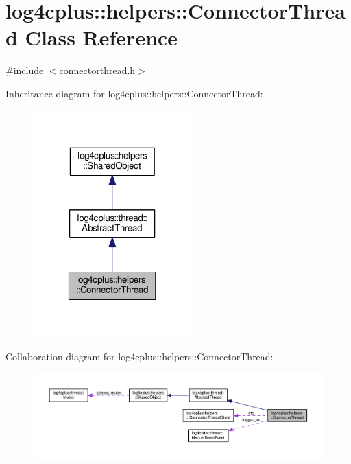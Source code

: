\hypertarget{classlog4cplus_1_1helpers_1_1ConnectorThread}{\section{log4cplus\-:\-:helpers\-:\-:Connector\-Thread Class Reference}
\label{classlog4cplus_1_1helpers_1_1ConnectorThread}
}


{\ttfamily \#include $<$connectorthread.\-h$>$}



Inheritance diagram for log4cplus\-:\-:helpers\-:\-:Connector\-Thread\-:
\nopagebreak
\begin{figure}[H]
\begin{center}
\leavevmode
\includegraphics[width=174pt]{classlog4cplus_1_1helpers_1_1ConnectorThread__inherit__graph}
\end{center}
\end{figure}


Collaboration diagram for log4cplus\-:\-:helpers\-:\-:Connector\-Thread\-:
\nopagebreak
\begin{figure}[H]
\begin{center}
\leavevmode
\includegraphics[width=350pt]{classlog4cplus_1_1helpers_1_1ConnectorThread__coll__graph}
\end{center}
\end{figure}
